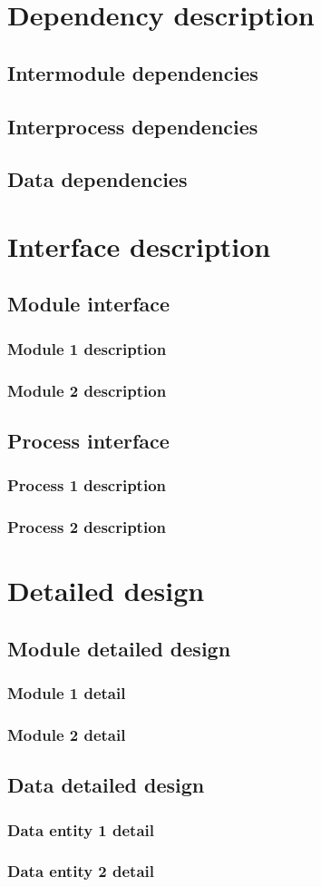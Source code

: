\documentclass[12pt]{article}
\begin{document}
\section{Dependency description}
\subsection{Intermodule dependencies}
\subsection{Interprocess dependencies}
\subsection{Data dependencies}

\section{Interface description}
\subsection{Module interface}
\subsubsection{Module 1 description}
\subsubsection{Module 2 description}
\subsection{Process interface}
\subsubsection{Process 1 description}
\subsubsection{Process 2 description}

\section{Detailed design}
\subsection{Module detailed design}
\subsubsection{Module 1 detail}
\subsubsection{Module 2 detail}
\subsection{Data detailed design}
\subsubsection{Data entity 1 detail}
\subsubsection{Data entity 2 detail}
\end{document}
